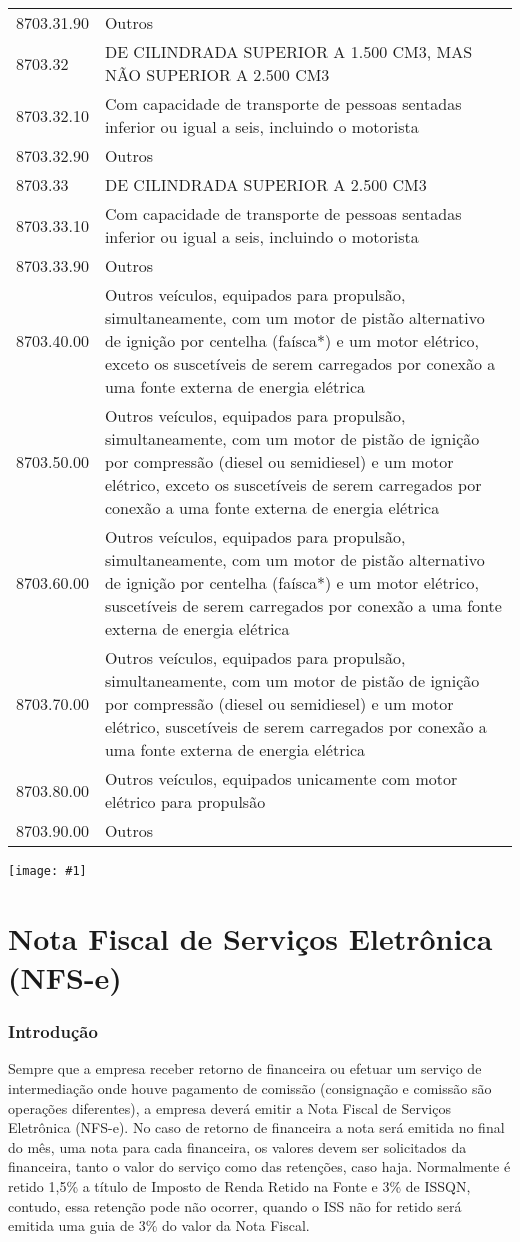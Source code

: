 \documentclass{article}
\newcommand{\imagem}[2]{
  \begin{center}
    \texttt{[image: \#1]}
  \end{center}
}
\newcommand{\parte}[1]{
  \pagebreak
  \partfont{\centering}
  \imagem{logo}{0.4}
  \vspace*{\fill}
    \part{#1}
  \vspace*{\fill}
  \pagebreak
}
\begin{document}
\begin{center}
\begin{longtable}{
    |p{}
    |p{}|
  }
    8703.31.90 & Outros \\
    8703.32 & DE CILINDRADA SUPERIOR A 1.500 CM3, MAS NÃO SUPERIOR A 2.500 CM3 \\
    8703.32.10 & Com capacidade de transporte de pessoas sentadas inferior ou igual a seis, incluindo o motorista \\
    8703.32.90 & Outros \\
    8703.33 & DE CILINDRADA SUPERIOR A 2.500 CM3 \\
    8703.33.10 & Com capacidade de transporte de pessoas sentadas inferior ou igual a seis, incluindo o motorista \\
    8703.33.90 & Outros \\
    8703.40.00 & Outros veículos, equipados para propulsão, simultaneamente, com um motor de pistão alternativo de ignição por centelha (faísca*) e um motor elétrico, exceto os suscetíveis de serem carregados por conexão a uma fonte externa de energia elétrica \\
    8703.50.00 & Outros veículos, equipados para propulsão, simultaneamente, com um motor de pistão de ignição por compressão (diesel ou semidiesel) e um motor elétrico, exceto os suscetíveis de serem carregados por conexão a uma fonte externa de energia elétrica \\
    8703.60.00 & Outros veículos, equipados para propulsão, simultaneamente, com um motor de pistão alternativo de ignição por centelha (faísca*) e um motor elétrico, suscetíveis de serem carregados por conexão a uma fonte externa de energia elétrica \\
    8703.70.00 & Outros veículos, equipados para propulsão, simultaneamente, com um motor de pistão de ignição por compressão (diesel ou semidiesel) e um motor elétrico, suscetíveis de serem carregados por conexão a uma fonte externa de energia elétrica \\
    8703.80.00 & Outros veículos, equipados unicamente com motor elétrico para propulsão \\
    8703.90.00 & Outros \\
    \hline
  \end{longtable}
\end{center}

\parte{Nota Fiscal de Serviços Eletrônica (NFS-e)}
\section{Introdução}
\label{sec:servico-intro}
Sempre que a empresa receber retorno de financeira ou efetuar um serviço de intermediação onde houve pagamento de comissão (consignação e comissão são operações diferentes), a empresa deverá emitir a Nota Fiscal de Serviços Eletrônica (NFS-e). No caso de retorno de financeira a nota será emitida no final do mês, uma nota para cada financeira, os valores devem ser solicitados da financeira, tanto o valor do serviço como das retenções, caso haja. Normalmente é retido 1,5\% a título de Imposto de Renda Retido na Fonte e 3\% de ISSQN, contudo, essa retenção pode não ocorrer, quando o ISS não for retido será emitida uma guia de 3\% do valor da Nota Fiscal.
\end{document}
